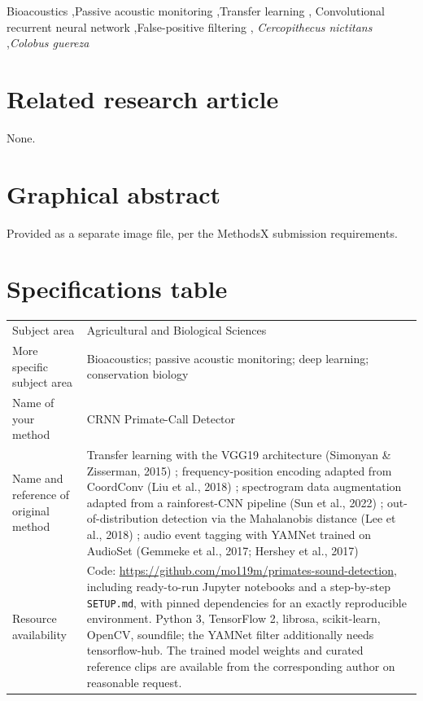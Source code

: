 \documentclass[final,3p,times]{elsarticle}
\begin{document}
\begin{frontmatter}
\begin{keyword}
Bioacoustics \sep Passive acoustic monitoring \sep Transfer learning \sep
Convolutional recurrent neural network \sep False-positive filtering \sep
\textit{Cercopithecus nictitans} \sep \textit{Colobus guereza}
\end{keyword}

\end{frontmatter}

\section*{Related research article}
None.

\section*{Graphical abstract}
Provided as a separate image file, per the MethodsX submission requirements.

\section*{Specifications table}

\noindent
\renewcommand{\arraystretch}{1.3}
\begin{tabularx}{\linewidth}{@{}lX@{}}
\toprule
Subject area & Agricultural and Biological Sciences \\
More specific subject area & Bioacoustics; passive acoustic monitoring;
deep learning; conservation biology \\
Name of your method & CRNN Primate-Call Detector \\
Name and reference of original method & Transfer learning with the VGG19
architecture (Simonyan \& Zisserman, 2015) \cite{simonyan2015}; frequency-position
encoding adapted from CoordConv (Liu et al., 2018) \cite{liu2018}; spectrogram
data augmentation adapted from a rainforest-CNN pipeline (Sun et al., 2022)
\cite{sun2022}; out-of-distribution detection via the Mahalanobis distance
(Lee et al., 2018) \cite{lee2018}; audio event tagging with YAMNet trained on
AudioSet (Gemmeke et al., 2017; Hershey et al., 2017) \cite{gemmeke2017,hershey2017} \\
Resource availability & Code:
\url{https://github.com/mo119m/primates-sound-detection}, including
ready-to-run Jupyter notebooks and a step-by-step \texttt{SETUP.md}, with
pinned dependencies for an exactly reproducible environment. Python 3,
TensorFlow 2, librosa, scikit-learn, OpenCV, soundfile; the YAMNet filter
additionally needs tensorflow-hub. The trained model weights and curated
reference clips are available from the corresponding author on reasonable
request. \\
\bottomrule
\end{tabularx}
\end{document}
